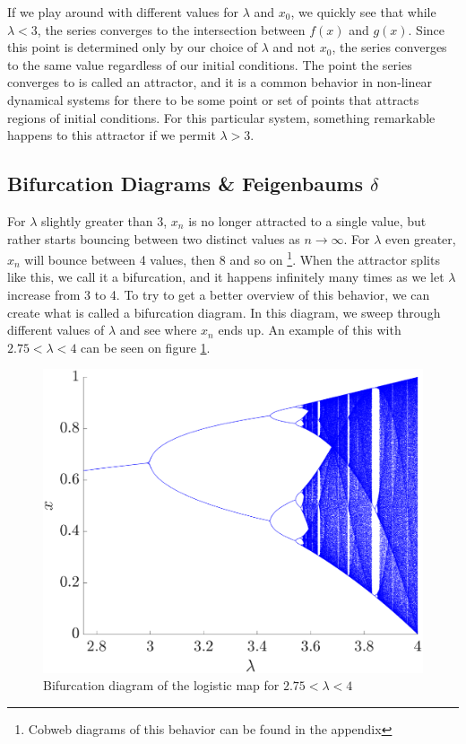 \documentclass[12pt,oneside,a4paper]{article}
\numberwithin{equation}{section}
\begin{document}
{{{{If we play around with different values for $\lambda$ and 
$x_0$, we quickly see that while $\lambda<3$, the series converges to the 
intersection between $f(x)$ and $g(x)$. Since this point is determined only by our choice of $\lambda$ 
and not $x_0$, the series converges to the same value regardless of our initial conditions. The point
the series converges to is called an attractor, and it is a common behavior in non-linear dynamical
systems for there to be some point or set of points that attracts regions of initial conditions. For this particular system, something remarkable happens to this attractor if we permit $\lambda>3$.



\subsection{Bifurcation Diagrams \& Feigenbaums $\delta$}
For $\lambda$ slightly greater than 3, $x_n$ is no longer attracted to a single value, but rather starts bouncing between two distinct values as $n \rightarrow \infty$. For $\lambda$ even greater, $x_n$ will bounce between 4 values, then 8 and so on \footnote{Cobweb diagrams of this behavior can be found in the appendix}. When the attractor splits like this, we call it a bifurcation, and it happens infinitely many times as we let $\lambda$ increase from 3 to 4. To try to get a better overview of this behavior, we can create what is called a bifurcation diagram. In this diagram, we sweep through different values of $\lambda$ and see where $x_n$ ends up. An example of this with $2.75<\lambda<4$ can be seen on figure \ref{bifurcation}.

\begin{figure}
	\centering
	\includegraphics[width=0.65\linewidth]{Figures/Bifurcation}
	\caption{Bifurcation diagram of the logistic map for $2.75<\lambda<4$}
	\label{bifurcation}
\end{figure}


}}}}
\end{document}
